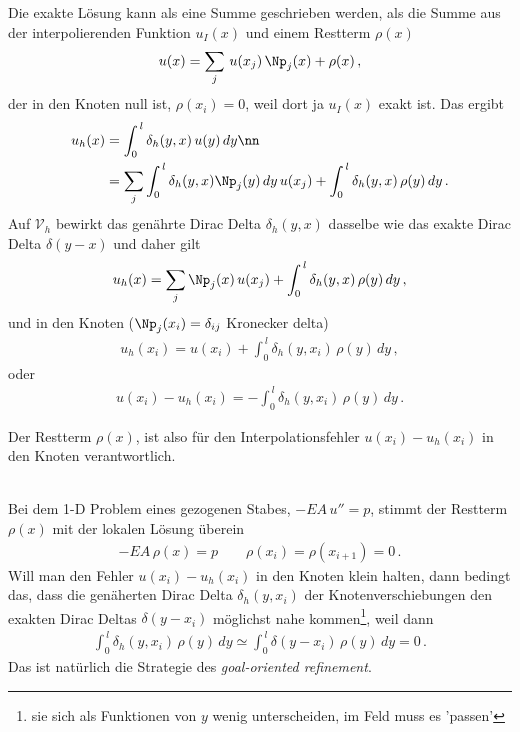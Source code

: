 {{{Die exakte L\"{o}sung kann als eine Summe geschrieben werden, als die Summe aus der interpolierenden Funktion $u_I(x)$ und einem Restterm $\rho(x)$
\begin{align}
u(x) = \sum_j\,u(x_j)\,\Np_j(x) + \rho(x)\,,
\end{align}
der in den Knoten null ist, $\rho(x_i) = 0$, weil dort ja $u_I(x)$ exakt ist. Das ergibt
\begin{align}
u_h(x) &=\int_0^{\,l}  \delta_h(y,x)\, u(y) \,dy\nn \\
 &= \sum_j \int_0^{\,l}\delta_h(y,x) \Np_j(y)\,dy \,u(x_j) + \int_0^{\,l}  \delta_h(y,x)\,\rho(y)\,dy\,.
\end{align}
Auf $\mathcal{V}_h$ bewirkt das gen\"{a}hrte Dirac Delta $\delta_h(y,x)$ dasselbe wie das exakte Dirac Delta $\delta(y-x)$ und daher gilt
\begin{align}
u_h(x) = \sum_j \Np_j(x) \,u(x_j) + \int_0^{\,l}  \delta_h(y,x)\,\rho(y)\,dy\,,
\end{align}
und in den Knoten ($\Np_j(x_i) = \delta_{ij}$ Kronecker delta)
\begin{align}
u_h(x_i) = u(x_i) + \int_0^{\,l}  \delta_h(y,x_i)\,\rho(y)\,dy\,,
\end{align}
oder
\begin{align}
u(x_i) - u_h(x_i) = - \int_0^{\,l}  \delta_h(y,x_i)\,\rho(y)\,dy\,.
\end{align}
\hspace*{-0pt}\colorbox{hellgrau}{\parbox{0.95\textwidth}{Der Restterm $\rho(x)$, ist also f\"{u}r den Interpolationsfehler $u(x_i) - u_h(x_i) $ in den Knoten verantwortlich.}}\\

Bei dem 1-D Problem eines gezogenen Stabes, $- EA\,u'' = p$, stimmt der Restterm $\rho(x)$ mit der lokalen L\"{o}sung \"{u}berein
\begin{align}
- EA\,\rho(x) = p \qquad \rho(x_i) = \rho(x_{i+1}) = 0\,.
\end{align}
Will man den Fehler $u(x_i) - u_h(x_i)$ in den Knoten klein halten, dann bedingt das, dass die gen\"{a}herten Dirac Delta $\delta_h(y,x_i)$ der Knotenverschiebungen den exakten Dirac Deltas $\delta(y-x_i)$  m\"{o}glichst nahe kommen\footnote{sie sich als Funktionen von $y$ wenig unterscheiden, im Feld muss es 'passen'}, weil dann
\begin{align}
\int_0^{\,l} \delta_h(y,x_i)\,\rho(y)\,dy \simeq \int_0^{\,l} \delta(y-x_i)\,\rho(y)\,dy = 0\,.
\end{align}
Das ist nat\"{u}rlich die Strategie des {\em goal-oriented refinement\/}.

}}}
